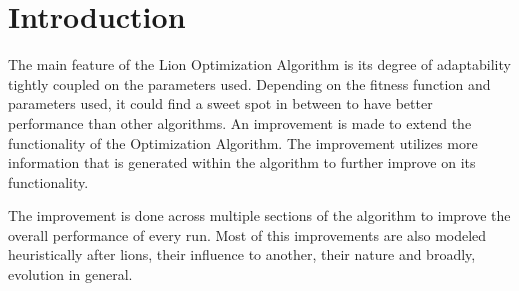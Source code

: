 \section{Introduction}
\par The main feature of the Lion Optimization Algorithm is its degree of adaptability tightly coupled on the parameters used. Depending on the fitness function and parameters used, it could find a sweet spot in between to have better performance than other algorithms. An improvement is made to extend the functionality of the Optimization Algorithm. The improvement utilizes more information that is generated within the algorithm to further improve on its functionality.

\par The improvement is done across multiple sections of the algorithm to improve the overall performance of every run. Most of this improvements are also modeled heuristically after lions, their influence to another, their nature and broadly, evolution in general.
